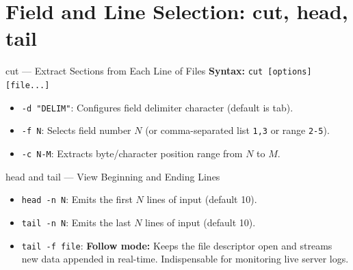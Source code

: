 
\section{Field and Line Selection: cut, head, tail}
\begin{commandbox}{cut --- Extract Sections from Each Line of Files}
\textbf{Syntax:} \texttt{cut [options] [file...]}
\begin{itemize}[leftmargin=1.5em]
    \item \texttt{-d "DELIM"}: Configures field delimiter character (default is tab).
    \item \texttt{-f N}: Selects field number $N$ (or comma-separated list \texttt{1,3} or range \texttt{2-5}).
    \item \texttt{-c N-M}: Extracts byte/character position range from $N$ to $M$.
\end{itemize}
\end{commandbox}

\begin{commandbox}{head and tail --- View Beginning and Ending Lines}
\begin{itemize}[leftmargin=1.5em]
    \item \texttt{head -n N}: Emits the first $N$ lines of input (default 10).
    \item \texttt{tail -n N}: Emits the last $N$ lines of input (default 10).
    \item \texttt{tail -f file}: \textbf{Follow mode:} Keeps the file descriptor open and streams new data appended in real-time. Indispensable for monitoring live server logs.
\end{itemize}
\end{commandbox}

